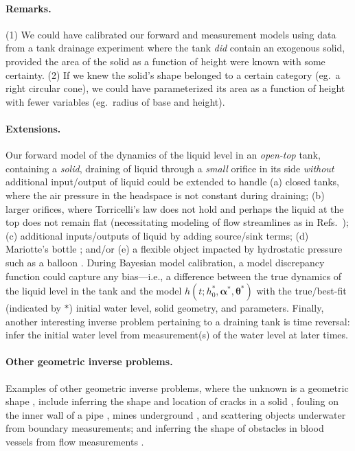 \documentclass[openacc]{rsproca_new}%
\begin{document}
\paragraph{Remarks.} (1) We could have calibrated our forward and measurement models using data from a tank drainage experiment where the tank \emph{did} contain an exogenous solid, provided the area of the solid as a function of height were known with some certainty. (2) If we knew the solid's shape belonged to a certain category (eg.\ a right circular cone), we could have parameterized its area as a function of height with fewer variables (eg.\ radius of base and height). 

\paragraph{Extensions.}
Our forward model of the dynamics of the liquid level in an \emph{open-top} tank, containing a \emph{solid}, draining of liquid through a \emph{small} orifice in its side \emph{without} additional input/output of liquid could be extended to handle 
(a) closed tanks, where the air pressure in the headspace is not constant during draining; 
(b) larger orifices, where Torricelli's law does not hold and perhaps the liquid at the top does not remain flat (necessitating modeling of flow streamlines as in Refs.~\cite{mathew2014numerical,sakri2017numerical});
(c) additional inputs/outputs of liquid by adding source/sink terms; 
(d) Mariotte's bottle \cite{kirevs2006mariotte}; and/or
(e) a flexible object impacted by hydrostatic pressure such as a balloon \cite{muller2004rubber}. 
During Bayesian model calibration, a model discrepancy \cite{brynjarsdottir2014learning,kennedy2001bayesian} function could capture any bias---i.e., a difference between the true dynamics of the liquid level in the tank and the model $h(t; h_0^*,  \boldsymbol \alpha^*, \boldsymbol \theta^*)$ with the true/best-fit (indicated by $*$) initial water level, solid geometry, and parameters.
Finally, another interesting inverse problem pertaining to a draining tank is time reversal: infer the initial water level from measurement(s) of the water level at later times.

\paragraph{Other geometric inverse problems.}
Examples of other geometric inverse problems, where the unknown is a geometric shape \cite{ameur2004level,burger2001level}, include inferring the shape and location of cracks in a solid \cite{nishimura1991boundary}, fouling on the inner wall of a pipe \cite{chen2011inverse}, mines underground \cite{delbary2007inverse,lopez2003detection}, and scattering objects underwater \cite{buchanan2004marine}
 from boundary measurements; and inferring the shape of obstacles in blood vessels from flow measurements \cite{aguayo2021distributed,nolte2022inverse}.
\end{document}
